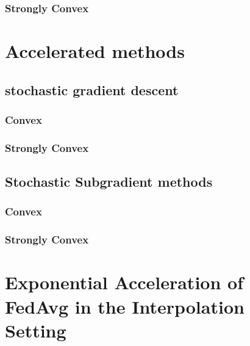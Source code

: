 \subsubsection{Strongly Convex}
\label{sec:sgdscvxnonsmth}




\section{Accelerated methods}
\subsection{stochastic gradient descent}
\subsubsection{Convex}
\label{sec:nasgdcvxsmth}


\subsubsection{Strongly Convex}
\label{sec:nasgdscvxsmth}


\subsection{Stochastic Subgradient methods}

\subsubsection{Convex}
\label{sec:nasgdcvxnonsmth}


\subsubsection{Strongly Convex}
\label{sec:nasgdscvxnonsmth}


\section{Exponential Acceleration of FedAvg in the Interpolation Setting}
\label{sec:interpolation}





